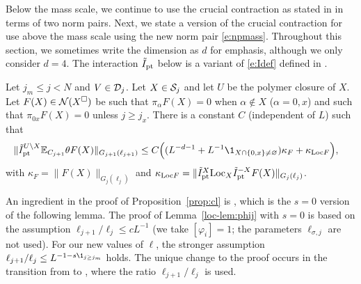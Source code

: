 Below the mass scale, we continue to use the crucial contraction as stated in
\cite[Proposition \ref{IE-prop:cl}]{BS-rg-IE} in terms of two norm pairs.
Next, we state a version of the crucial contraction for use above the mass
scale using the new norm pair \eqref{e:npmass}.
Throughout this section, we
sometimes write the dimension as $d$ for emphasis, although we only consider $d=4$.
The interaction $\tilde{I}_{\rm pt}$ below is a variant of \eqref{e:Idef} defined in \cite{BS-rg-IE}.

\begin{prop}
\label{prop:cl} Let $j_m \leq j<N$ and $V\in \mathcal{D}_j$.  Let $X \in \mathcal{S}_j$ and
let $U$ be the polymer closure of $X$.  Let $F(X) \in \mathcal{N}(X^\Box)$ be such that
$\pi_\alpha F(X) = 0$ when $\alpha\notin X$ ($\alpha = 0, x$) and such that
$\pi_{0x}F(X)=0$ unless $j \ge j_x$.
{There is a constant $C$ (independent of $L$) such that}
\begin{align}
    \label{e:contraction3z-new}
    \|\Ipttil^{U\setminus X} \Ex_{C_{j+1}} \theta F (X) \|_{{G_{j+1}(\ell_{j+1})}}
    &
    \leq C \Big(
    ( L^{-d -1} +  L^{-1}\1_{X \cap \{0,x\} \not = \varnothing} )
    \kappa_F
    + \kappa_{\LT F}
    \Big)
    ,
\end{align}
with $\kappa_F=\|F (X)\|_{{G_{j}(\ell_{j})}}$ and
$\kappa_{{\rm Loc} F} =\|\tilde{I}_{\rm pt}^X {\rm Loc}_X \tilde{I}_{\rm pt}^{-X} F(X) \|_{{G_{j}(\ell_{j})}}$.
\end{prop}

An ingredient in the proof of Proposition~\ref{prop:cl} is
\cite[Lemma~\ref{loc-lem:phij}]{BS-rg-loc}, which is the $s=0$ version of
the following lemma.
The proof of Lemma~\ref{loc-lem:phij} with $s = 0$
is based on the assumption  $\ell_{j+1}/\ell_j \leq  cL^{-1}$
(we take $[\varphi_i]=1$; the parameters $\ell_{\sigma,j}$ are not used).
For our new values of $\ell$, the stronger assumption
$\ell_{j+1}/\ell_j \leq L^{-1 - s \1_{j \geq j_m}}$ holds.
The unique change to the proof occurs in the transition from
\cite[\eqref{loc-e:gTay1}]{BS-rg-loc} to
\cite[\eqref{loc-e:rhognew}]{BS-rg-loc}, where the ratio
$\ell_{j+1}/\ell_j$ is used.


